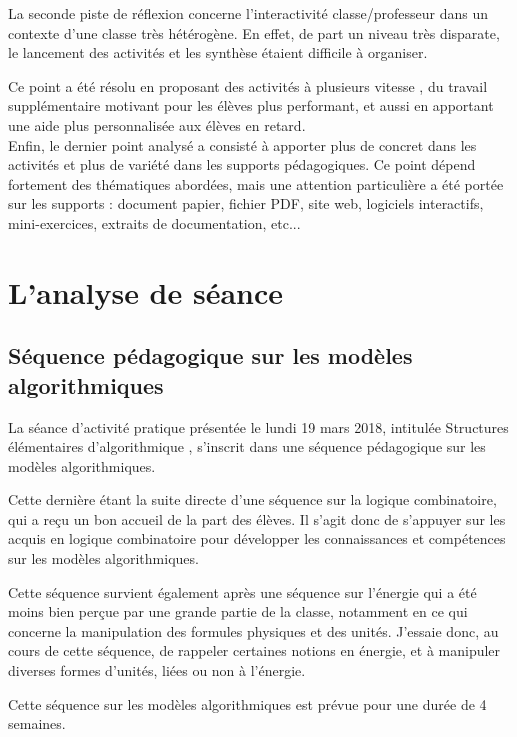 \documentclass[pdftex,a4paper,12pt]{article}
\begin{document}
	La seconde piste de réflexion concerne l'interactivité classe/professeur dans un contexte d'une classe très hétérogène.
	En effet, de part un niveau très disparate, le lancement des activités et les synthèse étaient difficile à organiser.

	Ce point a été résolu en proposant des activités \og{} à plusieurs vitesse \fg{}, 
	du travail supplémentaire motivant pour les élèves plus performant, 
	et aussi en apportant une aide plus personnalisée aux élèves en retard.\\

	Enfin, le dernier point analysé a consisté à apporter plus de concret dans les activités et plus de variété dans les supports pédagogiques.
	Ce point dépend fortement des thématiques abordées, mais une attention particulière a été portée sur les supports : 
	document papier, fichier PDF, site web, logiciels interactifs, mini-exercices, extraits de documentation, etc...

	\section{L'analyse de séance}
	\subsection{Séquence pédagogique sur les modèles algorithmiques}
	La séance d’activité pratique présentée le lundi 19 mars 2018, intitulée \og{} Structures élémentaires d’algorithmique \fg{}, 
	s'inscrit dans une séquence pédagogique sur les modèles algorithmiques. 

	Cette dernière étant la suite directe d’une séquence sur la logique combinatoire, qui a reçu un bon accueil de la part des élèves. 
	Il s'agit donc de s’appuyer sur les acquis en logique combinatoire pour développer les connaissances et compétences 
	sur les modèles algorithmiques.

	Cette séquence survient également après une séquence sur l'énergie qui a été moins bien perçue par une grande partie de la classe, 
	notamment en ce qui concerne la manipulation des formules physiques et des unités. 
	J'essaie donc, au cours de cette séquence, de rappeler certaines notions en énergie, et à manipuler diverses formes d’unités, 
	liées ou non à l'énergie.

	Cette séquence sur les modèles algorithmiques est prévue pour une durée de 4 semaines.\\
\end{document}

